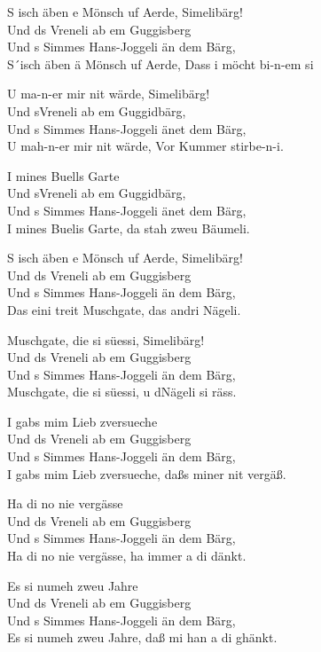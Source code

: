 \documentclass[
  letterpaper,
]{scrbook}
\begin{document}
S isch äben e Mönsch uf Aerde, Simelibärg!\\
Und ds Vreneli ab em Guggisberg\\
Und s Simmes Hans-Joggeli än dem Bärg,\\
S´isch äben ä Mönsch uf Aerde, Dass i möcht bi-n-em si

U ma-n-er mir nit wärde, Simelibärg!\\
Und s\textquotesingle Vreneli ab em Guggidbärg,\\
Und s\textquotesingle{} Simmes Hans-Joggeli änet dem Bärg,\\
U mah-n-er mir nit wärde, Vor Kummer stirbe-n-i.

I mines Buells Garte\\
Und s\textquotesingle Vreneli ab em Guggidbärg,\\
Und s\textquotesingle{} Simmes Hans-Joggeli änet dem Bärg,\\
I mines Buelis Garte, da stah zweu Bäumeli.

S isch äben e Mönsch uf Aerde, Simelibärg!\\
Und ds Vreneli ab em Guggisberg\\
Und s Simmes Hans-Joggeli än dem Bärg,\\
Das eini treit Muschgate, das andri Nägeli.

Muschgate, die si süessi, Simelibärg!\\
Und ds Vreneli ab em Guggisberg\\
Und s Simmes Hans-Joggeli än dem Bärg,\\
Muschgate, die si süessi, u d\textquotesingle Nägeli si räss.

I gabs mim Lieb z\textquotesingle versueche\\
Und ds Vreneli ab em Guggisberg\\
Und s Simmes Hans-Joggeli än dem Bärg,\\
I gabs mim Lieb z\textquotesingle versueche, daßs miner nit vergäß.

Ha di no nie vergässe\\
Und ds Vreneli ab em Guggisberg\\
Und s Simmes Hans-Joggeli än dem Bärg,\\
Ha di no nie vergässe, ha immer a di dänkt.

Es si numeh zweu Jahre\\
Und ds Vreneli ab em Guggisberg\\
Und s Simmes Hans-Joggeli än dem Bärg,\\
Es si numeh zweu Jahre, daß mi han a di ghänkt.
\end{document}
